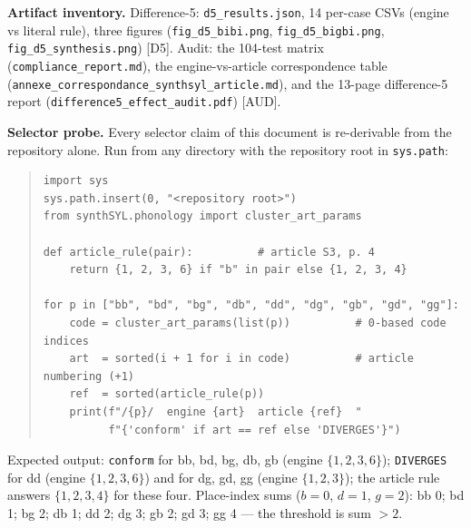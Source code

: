 \documentclass[11pt,letterpaper]{article}
\newcommand{\code}[1]{\texttt{#1}}
\begin{document}
\textbf{Artifact inventory.} Difference-5: \code{d5\_results.json}, 14
per-case CSVs (engine vs literal rule), three figures
(\code{fig\_d5\_bibi.png}, \code{fig\_d5\_bigbi.png},
\code{fig\_d5\_synthesis.png}) \hbox{[D5]}. Audit: the 104-test matrix
(\code{compliance\_report.md}), the engine-vs-article correspondence table
(\code{annexe\_correspondance\_}\allowbreak\code{synthsyl\_article.md}), and
the 13-page difference-5 report
(\code{difference5\_effect\_audit.pdf}) \hbox{[AUD]}.

\textbf{Selector probe.} Every selector claim of this document is
re-derivable from the repository alone. Run from any directory with the
repository root in \code{sys.path}:
\begin{quote}\small
\begin{verbatim}
import sys
sys.path.insert(0, "<repository root>")
from synthSYL.phonology import cluster_art_params

def article_rule(pair):          # article S3, p. 4
    return {1, 2, 3, 6} if "b" in pair else {1, 2, 3, 4}

for p in ["bb", "bd", "bg", "db", "dd", "dg", "gb", "gd", "gg"]:
    code = cluster_art_params(list(p))          # 0-based code indices
    art  = sorted(i + 1 for i in code)          # article numbering (+1)
    ref  = sorted(article_rule(p))
    print(f"/{p}/  engine {art}  article {ref}  "
          f"{'conform' if art == ref else 'DIVERGES'}")
\end{verbatim}
\end{quote}
\noindent Expected output: \code{conform} for bb, bd, bg, db, gb (engine
$\{1,2,3,6\}$); \code{DIVERGES} for dd (engine $\{1,2,3,6\}$) and for dg, gd,
gg (engine $\{1,2,3\}$); the article rule answers $\{1,2,3,4\}$ for these
four. Place-index sums ($b{=}0$, $d{=}1$, $g{=}2$): bb 0; bd 1; bg 2; db 1;
dd 2; dg 3; gb 2; gd 3; gg 4 --- the threshold is sum $> 2$.
\end{document}
